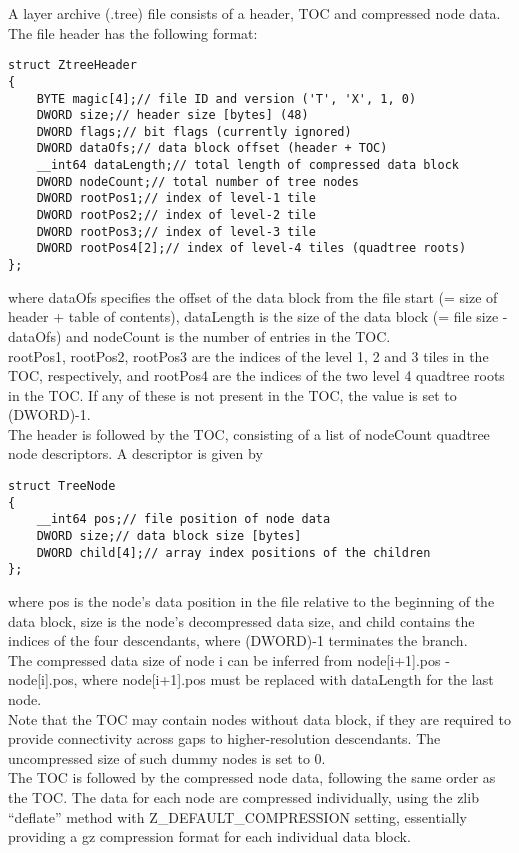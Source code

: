 \documentclass[Orbiter Developer Manual.tex]{subfiles}
\begin{document}
\noindent
A layer archive (.tree) file consists of a header, TOC and compressed node data. The file header has the following format:

\begin{lstlisting}
struct ZtreeHeader
{
	BYTE magic[4];// file ID and version ('T', 'X', 1, 0)
	DWORD size;// header size [bytes] (48)
	DWORD flags;// bit flags (currently ignored)
	DWORD dataOfs;// data block offset (header + TOC)
	__int64 dataLength;// total length of compressed data block
	DWORD nodeCount;// total number of tree nodes
	DWORD rootPos1;// index of level-1 tile
	DWORD rootPos2;// index of level-2 tile
	DWORD rootPos3;// index of level-3 tile
	DWORD rootPos4[2];// index of level-4 tiles (quadtree roots)
};
\end{lstlisting}

\noindent
where dataOfs specifies the offset of the data block from the file start (= size of header + table of contents), dataLength is the size of the data block (= file size - dataOfs) and nodeCount is the number of entries in the TOC.\\
rootPos1, rootPos2, rootPos3 are the indices of the level 1, 2 and 3 tiles in the TOC, respectively, and rootPos4 are the indices of the two level 4 quadtree roots in the TOC. If any of these is not present in the TOC, the value is set to (DWORD)-1.\\
The header is followed by the TOC, consisting of a list of nodeCount quadtree node descriptors. A descriptor is given by

\begin{lstlisting}
struct TreeNode
{
	__int64 pos;// file position of node data
	DWORD size;// data block size [bytes]
	DWORD child[4];// array index positions of the children
};
\end{lstlisting}

\noindent
where pos is the node's data position in the file relative to the beginning of the data block, size is the node's decompressed data size, and child contains the indices of the four descendants, where (DWORD)-1 terminates the branch.\\
The compressed data size of node i can be inferred from node[i+1].pos - node[i].pos, where node[i+1].pos must be replaced with dataLength for the last node.\\
Note that the TOC may contain nodes without data block, if they are required to provide connectivity across gaps to higher-resolution descendants. The uncompressed size of such dummy nodes is set to 0.\\
The TOC is followed by the compressed node data, following the same order as the TOC. The data for each node are compressed individually, using the zlib “deflate” method with Z\_DEFAULT\_COMPRESSION setting, essentially providing a gz compression format for each individual data block.
\end{document}
